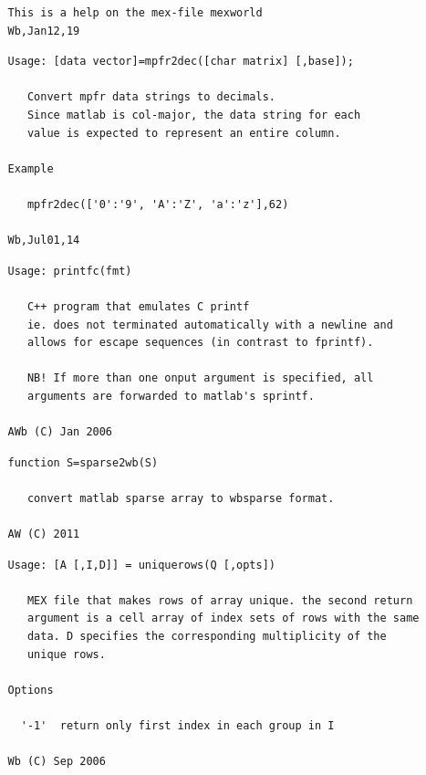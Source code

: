 \documentclass[twoside,12pt]{article}
\begin{document}
\pagebreak[3]



\begin{verbatim}
   This is a help on the mex-file mexworld
   Wb,Jan12,19
\end{verbatim}

\pagebreak[3]



\begin{verbatim}
   Usage: [data vector]=mpfr2dec([char matrix] [,base]);
 
      Convert mpfr data strings to decimals.
      Since matlab is col-major, the data string for each
      value is expected to represent an entire column.
 
   Example
 
      mpfr2dec(['0':'9', 'A':'Z', 'a':'z'],62)
 
   Wb,Jul01,14
\end{verbatim}

\pagebreak[3]



\begin{verbatim}
   Usage: printfc(fmt)
 
      C++ program that emulates C printf
      ie. does not terminated automatically with a newline and
      allows for escape sequences (in contrast to fprintf).
 
      NB! If more than one onput argument is specified, all
      arguments are forwarded to matlab's sprintf.
 
   AWb (C) Jan 2006
\end{verbatim}

\pagebreak[3]



\begin{verbatim}
   function S=sparse2wb(S)
 
      convert matlab sparse array to wbsparse format.
 
   AW (C) 2011
\end{verbatim}

\pagebreak[3]



\begin{verbatim}
   Usage: [A [,I,D]] = uniquerows(Q [,opts])
 
      MEX file that makes rows of array unique. the second return
      argument is a cell array of index sets of rows with the same
      data. D specifies the corresponding multiplicity of the
      unique rows.
 
   Options
 
     '-1'  return only first index in each group in I
 
   Wb (C) Sep 2006
\end{verbatim}
\end{document}
